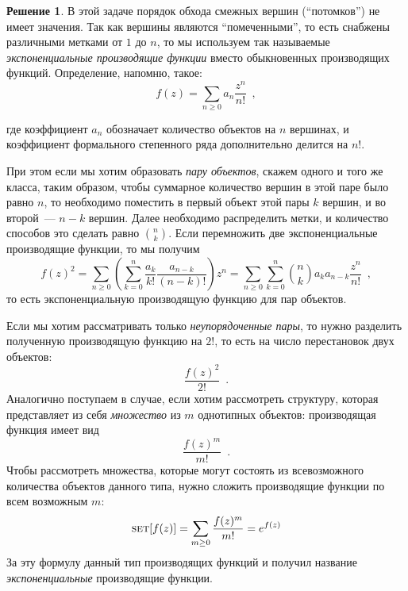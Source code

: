 \documentclass[a5paper]{article}
\theoremstyle{definition}
\newtheorem*{solution}{Решение}
\begin{document}
\begin{solution}
    В этой задаче порядок обхода смежных вершин (``потомков'') не имеет
значения. Так как вершины являются ``помеченными'', то есть снабжены различными метками от
\(1 \) до \(n \), то мы используем так называемые \textit{экспоненциальные
производящие функции} вместо обыкновенных производящих функций. Определение,
напомню, такое:
\begin{equation}
    f(z) = \sum_{n \geq 0} a_n \dfrac{z^n}{n!} \enspace ,
\end{equation}
\end{solution}
где коэффициент \( a_n \) обозначает количество объектов на \( n \) вершинах, и
коэффициент формального степенного ряда дополнительно делится на \( n! \).

При этом если мы хотим образовать \textit{пару объектов}, скажем одного и того
же класса, таким образом, чтобы суммарное количество вершин в этой паре было
равно \( n \), то необходимо поместить в первый объект этой пары \( k \) вершин,
и во второй~--- \( n-k \) вершин. Далее необходимо распределить метки, и
количество способов это сделать равно \( {n \choose k} \).
Если перемножить две экспоненциальные производящие функции, то мы получим
\begin{equation}
    f(z)^2 = \sum_{n \geq 0} \left( \sum_{k=0}^n \dfrac{a_k}{k!}
        \dfrac{a_{n-k}}{(n-k)!} \right) z^n
    = \sum_{n \geq 0} \sum_{k=0}^n { n \choose k } a_{k} a_{n-k} \dfrac{z^n}{n!}
    \enspace ,
\end{equation}
то есть экспоненциальную производящую функцию для пар объектов.

Если мы хотим рассматривать только \textit{неупорядоченные пары}, то нужно
разделить полученную производящую функцию на \( 2! \), то есть на число
перестановок двух объектов:
\begin{equation}
    \dfrac{f(z)^2}{2!}
    \enspace . 
\end{equation}
Аналогично поступаем в случае, если хотим рассмотреть структуру, которая
представляет из себя \textit{множество} из \( m \) однотипных объектов:
производящая функция имеет вид
\begin{equation}
    \dfrac{f(z)^m}{m!} \enspace .
\end{equation}
Чтобы рассмотреть множества, которые могут состоять из всевозможного количества
объектов данного типа, нужно сложить производящие функции по всем возможным \( m
\):
\begin{equation}
    \text{\textsc{set}} [ f(z) ] = \sum_{m \geq 0} \dfrac{f(z)^m}{m!} = e^{f(z)}
\end{equation}
За эту формулу данный тип производящих функций и получил название
\textit{экспоненциальные} производящие функции.
\end{document}
